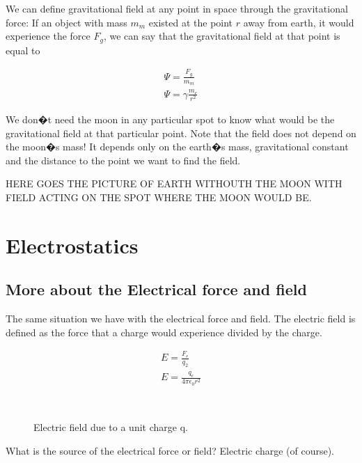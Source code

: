 We can define gravitational field at any point in space through the gravitational force: If an object with mass $m_m$ existed at the point $r$ away from earth, it would experience the force $F_g$, we can say that the gravitational field at that point is equal to

\begin{eqnarray}
\Psi = \frac{F_g}{m_m} \\
\Psi = \gamma \frac{m_e}{r^2}
\end{eqnarray} \label{gravitationalfield}


We don�t need the moon in any particular spot to know what would be the gravitational field at that particular point. Note that the field does not depend on the moon�s mass! It depends only on the earth�s mass, gravitational constant and the distance to the point we want to find the field.

HERE GOES THE PICTURE OF EARTH WITHOUTH THE MOON WITH FIELD ACTING ON THE SPOT WHERE THE MOON WOULD BE. 


\section{Electrostatics}




\subsection{More about the Electrical force and field}

The same situation we have with the electrical force and field. The electric field  is defined as the force that a charge would experience divided by the charge.


\begin{eqnarray}
E = \frac{F_e}{q_2} \\
E =  \frac{q_e}{4 \pi \epsilon_0 r^2}
\end{eqnarray} \label{electricfield}


\begin{figure}[htbp]
\begin{center}
\strut{} \\
\end{center}
\caption{Electric field due to a unit charge q.}
\label{wind}
\end{figure}



What is the source of the electrical force or field? Electric charge (of course). 

